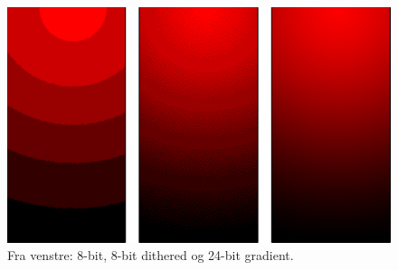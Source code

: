 \begin{figure}[H]
	\centering
	\includegraphics[width=0.7\linewidth]{figs/spm01/gradient}
	\caption{Fra venstre: 8-bit, 8-bit dithered og 24-bit gradient.}
	\label{fig:gradient}
\end{figure}
